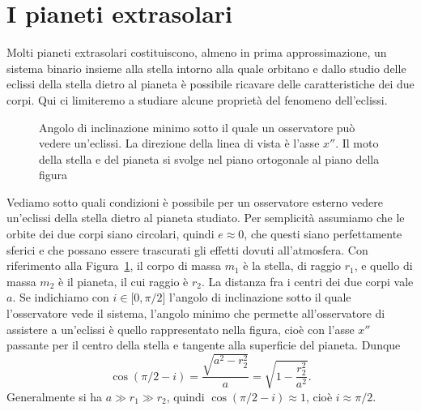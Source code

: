 \section{I pianeti extrasolari}
\label{sec:extrasolari}

Molti pianeti extrasolari costituiscono, almeno in prima approssimazione, un
sistema binario insieme alla stella intorno alla quale orbitano e dallo studio
delle eclissi della stella dietro al pianeta è possibile ricavare delle
caratteristiche dei due corpi. Qui ci limiteremo a studiare alcune proprietà del
fenomeno dell'eclissi.

\begin{figure}
  \centering
  \begin{tikzpicture}
    
  \end{tikzpicture}
  \caption[Angolo di inclinazione minimo sotto il quale un osservatore può
  vedere
  un'eclissi]{Angolo di inclinazione minimo sotto il quale un osservatore può
    vedere un'eclissi. La direzione della linea di vista è l'asse $x''$. Il moto
    della stella e del pianeta si svolge nel piano ortogonale al piano della
    figura}
  \label{fig:minimo-angolo-eclissi}
\end{figure}
Vediamo sotto quali condizioni è possibile per un osservatore esterno vedere
un'eclissi della stella dietro al pianeta studiato. Per semplicità assumiamo che
le orbite dei due corpi siano circolari, quindi $e \approx 0$, che questi siano
perfettamente sferici e che possano essere trascurati gli effetti dovuti
all'atmosfera. Con riferimento alla Figura~\ref{fig:minimo-angolo-eclissi}, il
corpo di massa $m_1$ è la stella, di raggio $r_1$, e quello di massa $m_2$ è
il pianeta, il cui raggio è $r_2$. La distanza fra i centri dei due corpi vale
$a$. Se indichiamo con $i \in \mathopen{[}0, \pi/2\mathclose{]}$ l'angolo di
inclinazione sotto il quale l'osservatore vede il sistema, l'angolo minimo che
permette all'osservatore di assistere a un'eclissi è quello rappresentato nella
figura, cioè con l'asse $x''$ passante per il centro della stella e tangente
alla superficie del pianeta. Dunque
\begin{equation}
  \cos(\pi/2 - i) = \frac{\sqrt{a^2 - r_2^2}}{a} = \sqrt{1 - \frac{r_2^2}{a^2}}.
\end{equation}
Generalmente si ha $a \gg r_1 \gg r_2$, quindi $\cos(\pi/2 - i) \approx 1$,
cioè $i \approx \pi/2$.

